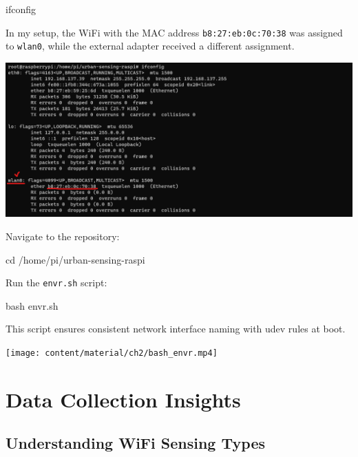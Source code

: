 \documentclass[
  letterpaper,
]{scrbook}
\newenvironment{Shaded}{\begin{snugshade}}{\end{snugshade}}
\newcommand{\BuiltInTok}[1]{\textcolor[rgb]{0.00,0.23,0.31}{#1}}
\newcommand{\ExtensionTok}[1]{\textcolor[rgb]{0.00,0.23,0.31}{#1}}
\newcommand{\FunctionTok}[1]{\textcolor[rgb]{0.28,0.35,0.67}{#1}}
\newcommand{\NormalTok}[1]{\textcolor[rgb]{0.00,0.23,0.31}{#1}}
\begin{document}
\begin{Shaded}
\begin{Highlighting}[]
\ExtensionTok{ifconfig}
\end{Highlighting}
\end{Shaded}

In my setup, the WiFi with the MAC address \texttt{b8:27:eb:0c:70:38}
was assigned to \texttt{wlan0}, while the external adapter received a
different assignment.

\includegraphics{content/material/ch2/ifconfig_wlan0.png}

Navigate to the repository:

\begin{Shaded}
\begin{Highlighting}[]
\BuiltInTok{cd}\NormalTok{ /home/pi/urban{-}sensing{-}raspi}
\end{Highlighting}
\end{Shaded}

Run the \texttt{envr.sh} script:

\begin{Shaded}
\begin{Highlighting}[]
\FunctionTok{bash}\NormalTok{ envr.sh}
\end{Highlighting}
\end{Shaded}

This script ensures consistent network interface naming with udev rules
at boot.

\texttt{[image: content/material/ch2/bash\_envr.mp4]}

\hypertarget{data-collection-insights}{%
\chapter{Data Collection Insights}\label{data-collection-insights}}

\hypertarget{understanding-wifi-sensing-types}{%
\section{Understanding WiFi Sensing
Types}\label{understanding-wifi-sensing-types}}
\end{document}
